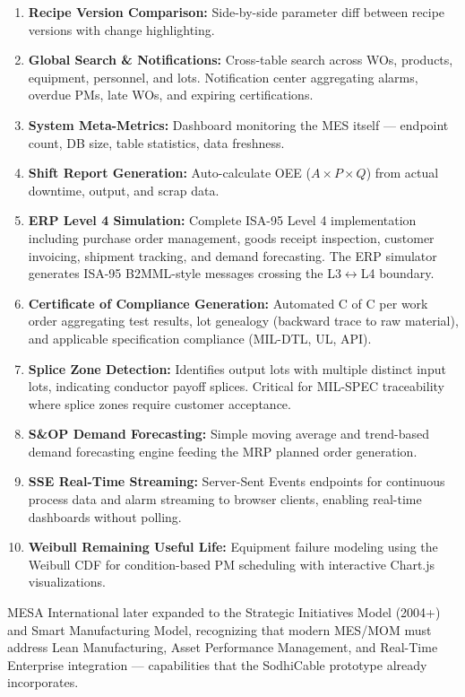 \documentclass[11pt]{article}
\begin{document}
\begin{enumerate}[leftmargin=2em, itemsep=1pt]
\item \textbf{Recipe Version Comparison:} Side-by-side parameter diff between recipe versions with change highlighting.
\item \textbf{Global Search \& Notifications:} Cross-table search across WOs, products, equipment, personnel, and lots. Notification center aggregating alarms, overdue PMs, late WOs, and expiring certifications.
\item \textbf{System Meta-Metrics:} Dashboard monitoring the MES itself --- endpoint count, DB size, table statistics, data freshness.
\item \textbf{Shift Report Generation:} Auto-calculate OEE ($A \times P \times Q$) from actual downtime, output, and scrap data.
\item \textbf{ERP Level 4 Simulation:} Complete ISA-95 Level 4 implementation including purchase order management, goods receipt inspection, customer invoicing, shipment tracking, and demand forecasting. The ERP simulator generates ISA-95 B2MML-style messages crossing the L3$\leftrightarrow$L4 boundary.
\item \textbf{Certificate of Compliance Generation:} Automated C of C per work order aggregating test results, lot genealogy (backward trace to raw material), and applicable specification compliance (MIL-DTL, UL, API).
\item \textbf{Splice Zone Detection:} Identifies output lots with multiple distinct input lots, indicating conductor payoff splices. Critical for MIL-SPEC traceability where splice zones require customer acceptance.
\item \textbf{S\&OP Demand Forecasting:} Simple moving average and trend-based demand forecasting engine feeding the MRP planned order generation.
\item \textbf{SSE Real-Time Streaming:} Server-Sent Events endpoints for continuous process data and alarm streaming to browser clients, enabling real-time dashboards without polling.
\item \textbf{Weibull Remaining Useful Life:} Equipment failure modeling using the Weibull CDF for condition-based PM scheduling with interactive Chart.js visualizations.
\end{enumerate}

MESA International later expanded to the Strategic Initiatives Model (2004+) and Smart Manufacturing Model, recognizing that modern MES/MOM must address Lean Manufacturing, Asset Performance Management, and Real-Time Enterprise integration --- capabilities that the SodhiCable prototype already incorporates.
\end{document}
